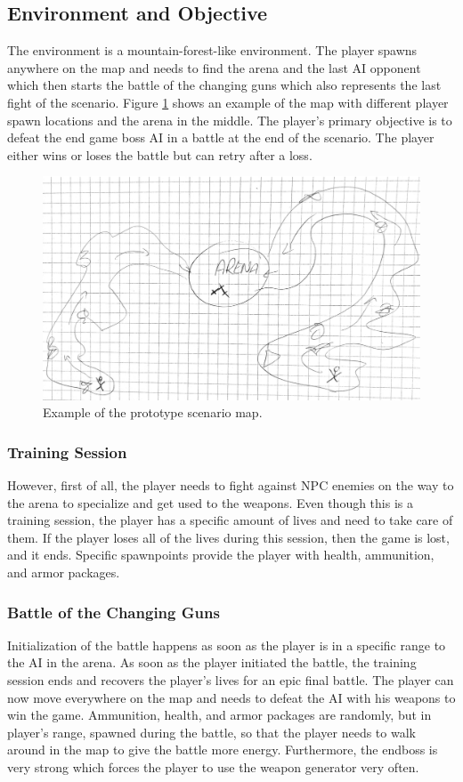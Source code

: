 \documentclass[MGS,Master,english]{twbook}%
\begin{document}
\subsection{Environment and Objective}
The environment is a mountain-forest-like environment. The player spawns anywhere on the map and needs to find the arena and the last AI opponent which then starts the battle of the changing guns which also represents the last fight of the scenario. Figure \ref{prototype::exampleMap} shows an example of the map with different player spawn locations and the arena in the middle. The player's primary objective is to defeat the end game boss AI in a battle at the end of the scenario. The player either wins or loses the battle but can retry after a loss.
\begin{figure}[!htbp]
	\centering
	\includegraphics[width=0.8\linewidth]{PICs/Prototype/map_example}
	\caption{Example of the prototype scenario map.}\label{prototype::exampleMap}
\end{figure}

\subsubsection{Training Session}
However, first of all, the player needs to fight against NPC enemies on the way to the arena to specialize and get used to the weapons. Even though this is a training session, the player has a specific amount of lives and need to take care of them. If the player loses all of the lives during this session, then the game is lost, and it ends. Specific spawnpoints provide the player with health, ammunition, and armor packages.

\subsubsection{Battle of the Changing Guns}
Initialization of the battle happens as soon as the player is in a specific range to the AI in the arena. As soon as the player initiated the battle, the training session ends and recovers the player's lives for an epic final battle. The player can now move everywhere on the map and needs to defeat the AI with his weapons to win the game. Ammunition, health, and armor packages are randomly, but in player's range, spawned during the battle, so that the player needs to walk around in the map to give the battle more energy. Furthermore, the endboss is very strong which forces the player to use the weapon generator very often. 
\end{document}
